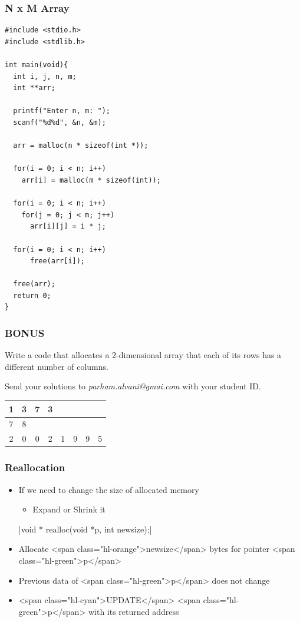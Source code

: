 \documentclass{../c-lecture}
\begin{document}
\begin{frame}[fragile]
  \frametitle{N x M Array}
  \begin{verbatim}
#include <stdio.h>
#include <stdlib.h>

int main(void){
  int i, j, n, m;
  int **arr;

  printf("Enter n, m: ");
  scanf("%d%d", &n, &m);

  arr = malloc(n * sizeof(int *));

  for(i = 0; i < n; i++)
    arr[i] = malloc(m * sizeof(int));

  for(i = 0; i < n; i++)
    for(j = 0; j < m; j++)
      arr[i][j] = i * j;

  for(i = 0; i < n; i++)
      free(arr[i]);

  free(arr);
  return 0;
}
  \end{verbatim}
\end{frame}

\begin{frame}
  \frametitle{BONUS 💯}
  \begin{block}{}
    Write a code that allocates a 2-dimensional array that each of its rows has
    a different number of columns.
  \end{block}
  \begin{block}{}
    Send your solutions to
    \textit{\color{Orange} parham.alvani@gmai.com} with your student ID.
  \end{block}
  \begin{table}
  \begin{tabular}{*{8}{c}}
    \toprule
      1 &
      3 &
      7 &
      3 &
      \multicolumn{4}{c}{} \\
    \midrule
      7 &
      8 &
      \multicolumn{6}{c}{} \\
    \midrule
      2 &
      0 &
      0 &
      2 &
      1 &
      9 &
      9 &
      5 \\
    \bottomrule
  \end{tabular}
  \end{table}
\end{frame}

\begin{frame}
  \frametitle{Reallocation}
  \begin{itemize}
    \item If we need to change the size of allocated memory
    \begin{itemize}
      \item Expand or Shrink it
    \end{itemize}
    |void * realloc(void *p, int newsize);|
    \item
      Allocate <span class="hl-orange">newsize</span> bytes for pointer
      <span class="hl-green">p</span>

    \item Previous data of <span class="hl-green">p</span> does not change
    \item
      <span class="hl-cyan">UPDATE</span> <span class="hl-green">p</span> with
      its returned address

  \end{itemize}
\end{frame}
\end{document}
